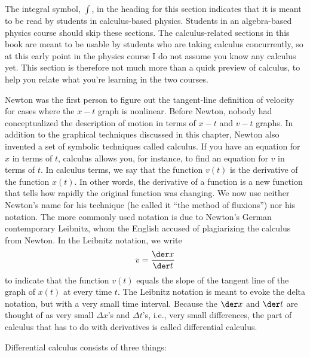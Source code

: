 The integral symbol, $\int$, in the heading for this
section indicates that it is meant to be read by students in
calculus-based physics. Students in an algebra-based physics
course should skip these sections. The calculus-related
sections in this book are meant to be usable by students who
are taking calculus concurrently, so at this early point in
the physics course I do not assume you know any calculus
yet. This section is therefore not much more than a quick
preview of calculus, to help you relate what you're
learning in the two courses.

Newton was the first person to figure out the tangent-line
definition of velocity for cases where the $x-t$ graph is
nonlinear. Before Newton, nobody had conceptualized the
description of motion in terms of $x-t$ and $v-t$ graphs. In
addition to the graphical techniques discussed in this
chapter, Newton also invented a set of symbolic techniques
called calculus. If you have an equation for $x$ in terms of
$t$, calculus allows you, for instance, to find an equation
for $v$ in terms of $t$. In calculus terms, we say that the
function $v(t)$ is the derivative of the function $x(t)$. In
other words, the derivative of a function is a new function
that tells how rapidly the original function was changing.
We now use neither Newton's name for his technique (he
called it ``the method of fluxions'') nor his notation. The
more commonly used notation is due to Newton's German
contemporary Leibnitz, whom the English accused of
plagiarizing the calculus from Newton. In the Leibnitz notation, we write
\begin{equation*}
  v = \frac{\der x}{\der t}
\end{equation*}
to indicate that the function $v(t)$ equals the slope of the
tangent line of the graph of $x(t)$ at every time $t$. The
Leibnitz notation is meant to evoke the delta notation, but
with a very small time interval. Because the $\der x$ and
$\der t$ are thought of as very small $\Delta x$'s and
$\Delta t$'s, i.e., very small differences, the part of
calculus that has to do with derivatives is called
differential calculus.

Differential calculus
consists of three things:

